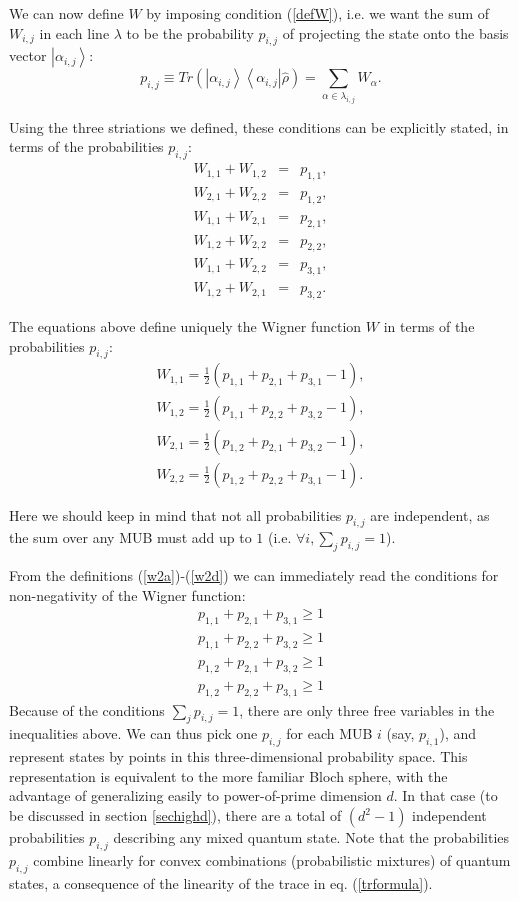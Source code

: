 \documentclass[aps,twocolumn,showpacs,nofootinbib,groupedaddress]{revtex4}
\begin{document}
We can now define $W$ by imposing condition (\ref{defW}), i.e. we
want the sum of $W_{i,j}$ in each line $\lambda$ to be the
probability $p_{i,j}$ of projecting the state onto the basis
vector $\left|\alpha_{i,j}\right\rangle$:
\begin{equation}
p_{i,j}\equiv Tr\left(
\left|\alpha_{i,j}\right\rangle\left\langle\alpha_{i,j}\right|
\hat{\rho} \right)=\sum_{\alpha \in
\lambda_{i,j}}W_{\alpha}.\label{trformula}
\end{equation}

Using the three striations we defined, these conditions can be
explicitly stated, in terms of the probabilities $p_{i,j}$:
\begin{eqnarray}
W_{1,1}+W_{1,2}&=&p_{1,1},\\
W_{2,1}+W_{2,2}&=&p_{1,2},\\
W_{1,1}+W_{2,1}&=&p_{2,1},\\
W_{1,2}+W_{2,2}&=&p_{2,2},\\
W_{1,1}+W_{2,2}&=&p_{3,1},\\
W_{1,2}+W_{2,1}&=&p_{3,2}.
\end{eqnarray}

The equations above define uniquely the Wigner function $W$ in
terms of the probabilities $p_{i,j}$:
\begin{eqnarray}
W_{1,1}=\frac{1}{2}\left( p_{1,1}+p_{2,1}+p_{3,1}-1\right), \label{w2a}\\
W_{1,2}=\frac{1}{2}\left( p_{1,1}+p_{2,2}+p_{3,2}-1\right),\\
W_{2,1}=\frac{1}{2}\left( p_{1,2}+p_{2,1}+p_{3,2}-1\right),\\
W_{2,2}=\frac{1}{2}\left(
p_{1,2}+p_{2,2}+p_{3,1}-1\right).\label{w2d}
\end{eqnarray}

Here we should keep in mind that not all probabilities $p_{i,j}$
are independent, as the sum over any MUB must add up to $1$ (i.e.
$\forall i, \sum_j {p_{i,j}=1}$).

From the definitions (\ref{w2a})-(\ref{w2d}) we can immediately
read the conditions for non-negativity of the Wigner function:
\begin{eqnarray}
p_{1,1}+p_{2,1}+p_{3,1}\ge1 \label{ip2a}\\
p_{1,1}+p_{2,2}+p_{3,2}\ge1\\
p_{1,2}+p_{2,1}+p_{3,2}\ge1\\
p_{1,2}+p_{2,2}+p_{3,1}\ge1\label{ip2d}
\end{eqnarray}
Because of the conditions $\sum_j {p_{i,j}=1}$, there are only
three free variables in the inequalities above. We can thus pick
one $p_{i,j}$ for each MUB $i$ (say, $p_{i,1}$), and represent
states by points in this three-dimensional probability space. This
representation is equivalent to the more familiar Bloch sphere,
with the advantage of generalizing easily to power-of-prime
dimension $d$. In that case (to be discussed in section
\ref{sechighd}), there are a total of $(d^2-1)$ independent
probabilities $p_{i,j}$ describing any mixed quantum state. Note
that the probabilities $p_{i,j}$ combine linearly for convex
combinations (probabilistic mixtures) of quantum states, a
consequence of the linearity of the trace in eq.
(\ref{trformula}).
\end{document}
